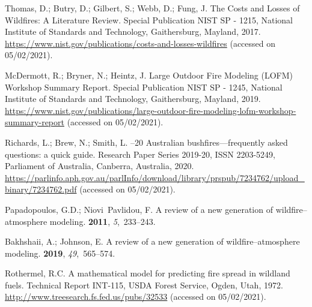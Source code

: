 \documentclass[atmosphere,article,accept,moreauthors,pdftex]{Definitions/mdpi}
\begin{document}
\begin{thebibliography}{999}

Thomas, D.; Butry, D.; Gilbert, S.; Webb, D.; Fung, J.
\newblock The Costs and Losses of Wildfires: A Literature Review.
\newblock Special Publication NIST SP - 1215, National Institute of Standards
  and Technology, Gaithersburg, Mayland,  2017.
\newblock
  \href{https://www.nist.gov/publications/costs-and-losses-wildfires}{https://www.nist.gov/publications/costs-and-losses-wildfires} (accessed on 05/02/2021).

McDermott, R.; Bryner, N.; Heintz, J.
\newblock Large Outdoor Fire Modeling (LOFM) Workshop Summary Report.
\newblock Special Publication NIST SP - 1245, National Institute of Standards
  and Technology, Gaithersburg, Mayland,  2019.
\newblock
  \href{https://www.nist.gov/publications/large-outdoor-fire-modeling-lofm-workshop-summary-report}{https://www.nist.gov/publications/large-outdoor-fire-modeling-lofm-workshop-summary-report} (accessed on 05/02/2021).

Richards, L.; Brew, N.; Smith, L.
–20 Australian bushfires—frequently asked questions: a quick
  guide.
\newblock Research Paper Series 2019-20, ISSN 2203-5249, Parliament of
  Australia, Canberra, Australia,  2020.
\newblock
  \href{https://parlinfo.aph.gov.au/parlInfo/download/library/prspub/7234762/upload\_binary/7234762.pdf}{https://parlinfo.aph.gov.au/parlInfo/download/library/prspub/7234762/upload\_binary/7234762.pdf} (accessed on 05/02/2021).

Papadopoulos, G.D.; Niovi~Pavlidou, F.
\newblock A review of a new generation of wildfire–atmosphere modeling.
 {\bf 2011}, {\em 5},~233--243.

Bakhshaii, A.; Johnson, E.
\newblock A review of a new generation of wildfire–atmosphere modeling.
 {\bf 2019}, {\em
  49},~565--574.

Rothermel, R.C.
\newblock A mathematical model for predicting fire spread in wildland fuels.
\newblock Technical Report INT-115, USDA Forest Service, Ogden, Utah,  1972.
\newblock
  \href{http://www.treesearch.fs.fed.us/pubs/32533}{http://www.treesearch.fs.fed.us/pubs/32533} (accessed on 05/02/2021).


\end{thebibliography}
\end{document}
